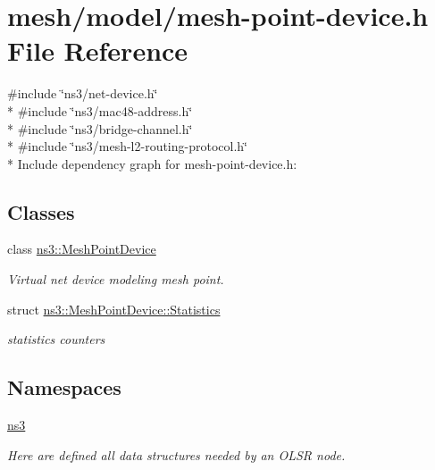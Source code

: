 \hypertarget{mesh-point-device_8h}{}\section{mesh/model/mesh-\/point-\/device.h File Reference}
\label{mesh-point-device_8h}
{\ttfamily \#include \char`\"{}ns3/net-\/device.\+h\char`\"{}}\\*
{\ttfamily \#include \char`\"{}ns3/mac48-\/address.\+h\char`\"{}}\\*
{\ttfamily \#include \char`\"{}ns3/bridge-\/channel.\+h\char`\"{}}\\*
{\ttfamily \#include \char`\"{}ns3/mesh-\/l2-\/routing-\/protocol.\+h\char`\"{}}\\*
Include dependency graph for mesh-\/point-\/device.h\+:
\subsection*{Classes}
\begin{DoxyCompactItemize}
\item 
class \hyperlink{classns3_1_1MeshPointDevice}{ns3\+::\+Mesh\+Point\+Device}
\begin{DoxyCompactList}\small\item\em Virtual net device modeling mesh point. \end{DoxyCompactList}\item 
struct \hyperlink{structns3_1_1MeshPointDevice_1_1Statistics}{ns3\+::\+Mesh\+Point\+Device\+::\+Statistics}
\begin{DoxyCompactList}\small\item\em statistics counters \end{DoxyCompactList}\end{DoxyCompactItemize}
\subsection*{Namespaces}
\begin{DoxyCompactItemize}
\item 
 \hyperlink{namespacens3}{ns3}
\begin{DoxyCompactList}\small\item\em Here are defined all data structures needed by an O\+L\+SR node. \end{DoxyCompactList}\end{DoxyCompactItemize}
